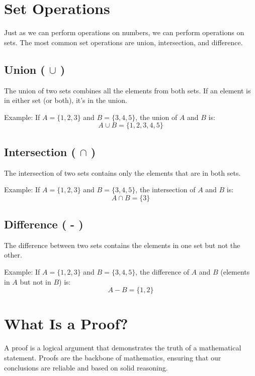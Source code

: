 \section{Set Operations}
Just as we can perform operations on numbers, we can perform operations on sets. The most common set operations are union, intersection, and difference.

\subsection{Union ( \(\cup\) )}
The union of two sets combines all the elements from both sets. If an element is in either set (or both), it’s in the union.

Example: If \( A = \{1, 2, 3\} \) and \( B = \{3, 4, 5\} \), the union of \( A \) and \( B \) is:
\[ A \cup B = \{1, 2, 3, 4, 5\} \]

\subsection{Intersection ( \(\cap\) )}
The intersection of two sets contains only the elements that are in both sets.

Example: If \( A = \{1, 2, 3\} \) and \( B = \{3, 4, 5\} \), the intersection of \( A \) and \( B \) is:
\[ A \cap B = \{3\} \]

\subsection{Difference ( - )}
The difference between two sets contains the elements in one set but not the other.

Example: If \( A = \{1, 2, 3\} \) and \( B = \{3, 4, 5\} \), the difference of \( A \) and \( B \) (elements in \( A \) but not in \( B \)) is:
\[ A - B = \{1, 2\} \]

\section{What Is a Proof?}
A proof is a logical argument that demonstrates the truth of a mathematical statement. Proofs are the backbone of mathematics, ensuring that our conclusions are reliable and based on solid reasoning.

